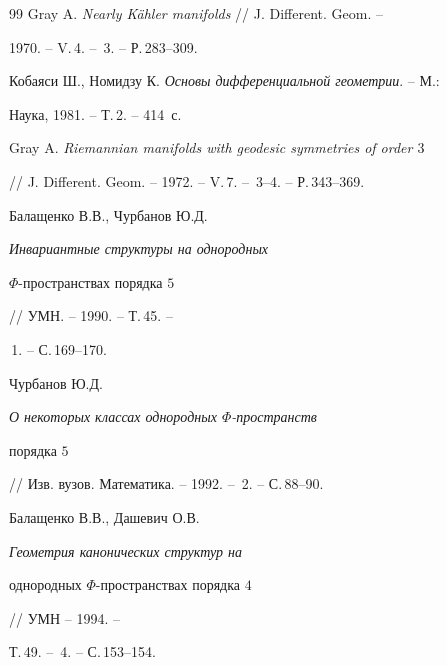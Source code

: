 \begin{thebibliography}{99}
Gray A. {\em Nearly K\"ahler manifolds} // J. Different. Geom. -- 


1970. -- V.\,4. -- \No\,3. -- Р.\,283--309.




Кобаяси Ш., Номидзу К. {\em Основы дифференциальной геометрии}. -- М.: 


Наука, 1981. -- Т.\,2. -- 414~с. 




Gray A. {\em Riemannian manifolds with geodesic symmetries of order $3$} 


// J. Different. Geom. -- 1972. -- V.\,7. -- \No\,3--4. -- Р.\,343--369. 




Балащенко В.В., Чурбанов Ю.Д. {\em Инвариантные структуры на однородных


$\Phi$-пространствах порядка $5$} // УМН. -- 1990. -- Т.\,45. --


\No\,1. -- С.\,169--170. 




Чурбанов Ю.Д. {\em О некоторых классах однородных $\Phi$-пространств 


порядка $5$ }  


// Изв. вузов. Математика. -- 1992. -- \No\,2. -- С.\,88--90. 




Балащенко В.В., Дашевич О.В. {\em Геометрия канонических структур на 


однородных $\Phi$-пространствах порядка $4$} // УМН -- 1994. -- 


Т.\,49. -- \No\,4. -- С.\,153--154. 


 


\end{thebibliography} 


 


\vskip 2cm 


 






 


\label{end} 


 


